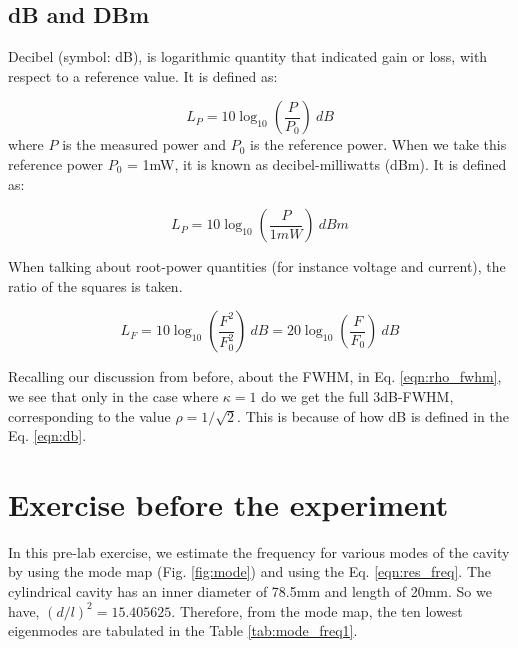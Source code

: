 \documentclass[a4paper]{report}
\numberwithin{equation}{section}
\begin{document}
\section{dB and DBm}
Decibel (symbol: dB), is logarithmic quantity that indicated gain or loss, with respect to a reference value. It is defined as: 

\begin{equation}
		L_{P} = 10  \log_{10}\left(\frac{P}{P_0}\right) \ dB
\end{equation}
where $P$ is the measured power and $P_{0}$ is the reference power. When we take this reference power $P_{0}$ = 1mW, it is known as decibel-milliwatts (dBm). It is defined as: 

\begin{equation}
		L_{P} = 10 \log_{10} \left(\frac{P}{1 mW}\right) \ dBm
\end{equation}

When talking about root-power quantities (for instance voltage and current), the ratio of the squares is taken.

\begin{equation} \label{eqn:db}
		L_{F} = 10 \log_{10} \left(\frac{F^2}{F_{0}^2}\right) \ dB = 20 \log_{10} \left(\frac{F}{F_{0}}\right) \ dB
\end{equation}

Recalling our discussion from before, about the FWHM, in Eq. \ref{eqn:rho_fwhm}, we see that only in the case where $\kappa = 1$ do we get the full 3dB-FWHM, corresponding to the value $\rho = 1/\sqrt{2}$. This is because of how dB is defined in the Eq. \ref{eqn:db}.  

\chapter{Exercise before the experiment}

In this pre-lab exercise, we estimate the frequency for various modes of the cavity by using the mode map (Fig. \ref{fig:mode}) and using the Eq. \ref{eqn:res_freq}. The cylindrical cavity has an inner diameter of 78.5mm and length of 20mm. 
So we have, $\left(d/l\right)^2 = 15.405625$. Therefore, from the mode map, the ten lowest eigenmodes are tabulated in the Table \ref{tab:mode_freq1}. 
\end{document}
